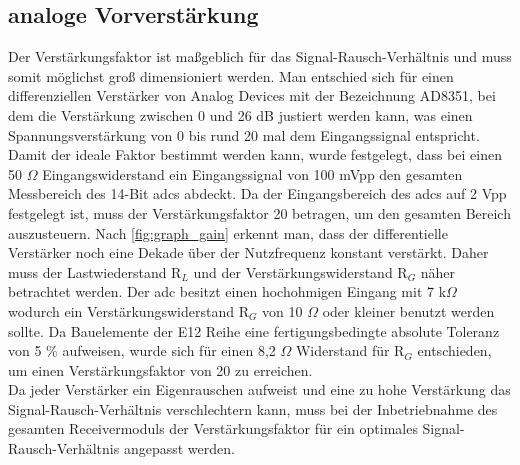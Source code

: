 \subsection{analoge Vorverstärkung}
Der Verstärkungsfaktor ist maßgeblich für das Signal-Rausch-Verhältnis und muss somit möglichst groß dimensioniert werden. Man entschied sich für einen differenziellen Verstärker von Analog Devices mit der Bezeichnung AD8351\cite{ad8351}, bei dem die Verstärkung zwischen 0 und 26 dB justiert werden kann, was einen Spannungsverstärkung von 0 bis rund 20 mal dem Eingangssignal entspricht.\\
Damit der ideale Faktor bestimmt werden kann, wurde festgelegt, dass bei einen 50 $\Omega$ Eingangswiderstand ein Eingangssignal von 100 mV\ac{pp} den gesamten Messbereich des 14-Bit \ac{adc}s abdeckt. Da der Eingangsbereich des \ac{adc}s auf 2 V\ac{pp} festgelegt ist, muss der Verstärkungsfaktor 20 betragen, um den gesamten Bereich auszusteuern. Nach \autoref{fig:graph_gain} erkennt man, dass der differentielle Verstärker noch eine Dekade über der Nutzfrequenz konstant verstärkt. Daher muss der Lastwiederstand R$_L$ und der Verstärkungswiderstand R$_G$ näher betrachtet werden. Der \ac{adc} besitzt einen hochohmigen Eingang mit 7 k$\Omega$ wodurch ein Verstärkungswiderstand R$_G$ von 10 $\Omega$ oder kleiner benutzt werden sollte.
Da Bauelemente der E12 Reihe eine fertigungsbedingte absolute Toleranz von 5 $\%$ aufweisen, wurde sich für einen 8,2 $\Omega$ Widerstand für R$_G$ entschieden, um einen Verstärkungsfaktor von 20 zu erreichen.\\
Da jeder Verstärker ein Eigenrauschen aufweist und eine zu hohe Verstärkung das Signal-Rausch-Verhältnis verschlechtern kann, muss bei der Inbetriebnahme des gesamten Receivermoduls der Verstärkungsfaktor für ein optimales Signal-Rausch-Verhältnis angepasst werden.
